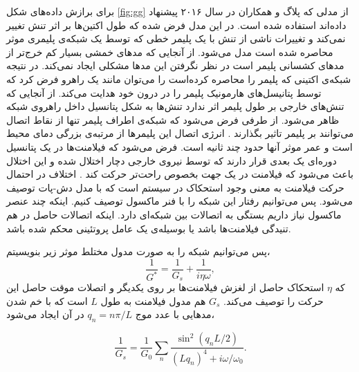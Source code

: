 برای برازش داده‌های شکل  \ref{fig:gg} از مدلی که پلاگ و همکاران در سال ۲۰۱۶ پیشنهاد داده‌اند استفاده شده است. در این مدل فرض شده که طول اکتین‌ها بر اثر تنش تغییر نمی‌کند و تغییرات ناشی از تنش با یک پلیمر خطی که توسط یک شبکه‌ی  پلیمری موثر محاصره شده است مدل می‌شود. از آنجایی که مد‌های خمشی بسیار کم خرج‌تر از مد‌های کشسانی‌ پلیمر است در نظر نگرفتن این مدها مشکلی ایجاد نمی‌کند. در نتیجه  شبکه‌ی اکتینی که پلیمر را محاصر‌ه کرده‌است را می‌توان مانند یک راهرو فرض کرد که توسط پتانیسل‌های هارمونیک پلیمر را در درون خود هدایت می‌کند. از آنجایی که تنش‌های خارجی بر طول پلیمر اثر ندارد تنش‌ها به شکل پتانسیل داخل راهروی شبکه ظاهر می‌شود. از طرفی فرض می‌شود که شبکه‌ی اطراف پلیمر تنها از نقاط اتصال می‌توانند بر پلیمر تاثیر بگذارند \cite{doi:10.1063/1.5030169, PhysRevE.93.062502}. انرژی اتصال این پلیمر‌ها از مرتبه‌ی بزرگی دمای محیط است و عمر موثر آنها حدود چند ثانیه ‌است.\cite{doi:10.1021/acs.jpcb.7b11491} فرض می‌شود که فیلامنت‌ها در یک پتانسیل دوره‌ای یک بعدی قرار دارند که توسط نیروی خارجی دچار اختلال شده و این اختلال باعث می‌شود که فیلامنت در یک جهت بخصوص راحت‌تر حرکت کند \cite{PhysRevE.93.062502}. اختلاف در احتمال حرکت فیلامنت به معنی وجود استحکاک در سیستم است که با مدل دش-پات توصیف می‌شود. پس می‌توانیم رفتار این شبکه را با فنر ماکسول توصیف کنیم. اینکه چند عنصر ماکسول نیاز داریم بستگی به اتصالات بین شبکه‌ای دارد. اینکه اتصالات حاصل در هم تنیدگی فیلامنت‌ها باشد یا بوسیله‌ی یک عامل پروتئینی محکم شده باشد.


پس می‌توانیم شبکه را به صورت مدول مختلط موثر زیر بنویسیتم،
\begin{equation}
\frac{1}{G^*}=\frac{1}{G_s}+\frac{1}{i\eta\omega},
\end{equation}
که $\eta$ استحکاک حاصل از لغزش فیلامنت‌ها بر روی یکدیگر و اتصلات موقت حاصل این حرکت را توصیف می‌کند. $G_s$ هم مدول فیلامنت به طول $L$ است که با خم‌ شدن مدهایی با عدد موج $q_n=n\pi/L$ در آن ایجاد می‌شود،


\begin{equation}
\frac{1}{G_s}=\frac{1}{G_0}\sum_n\frac{\sin^2(q_nL/2)}{(Lq_n)^4+i\omega/\omega_0}.
\label{eq:Gs}
\end{equation}


